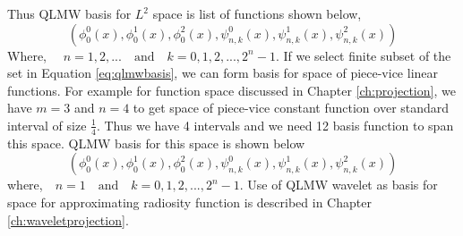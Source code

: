 


Thus QLMW basis for $L^2$ space is list of functions shown below,
\begin{equation}\label{eq:qlmwbasis}
(\phi^0_0(x),\phi^1_0(x),\phi^2_0(x),\psi^0_{n,k}(x),\psi^1_{n,k}(x),\psi^2_{n,k}(x))
\end{equation}
Where, $\quad n= 1, 2,... \quad\text{and} \quad k=0,1,2,...,2^n-1$.
If we select finite subset of the set in Equation \ref{eq:qlmwbasis}, we can form basis for space of piece-vice linear functions. For example for function space discussed in Chapter \ref{ch:projection}, we have $m=3$ and $n=4$ to get space of piece-vice constant function over standard interval of size $\frac{1}{4}$. Thus we have 4 intervals and we need 12 basis function to span this space. QLMW basis for this space is shown below
\begin{equation}\label{eq:haarbasis_n4}
(\phi^0_0(x),\phi^1_0(x),\phi^2_0(x),\psi^0_{n,k}(x),\psi^1_{n,k}(x),\psi^2_{n,k}(x))
\end{equation}
where,$\quad n=1 \quad \text{and} \quad k=0,1,2,...,2^n-1$. Use of QLMW wavelet as basis for space for approximating radiosity function is described in Chapter \ref{ch:waveletprojection}.

 
 